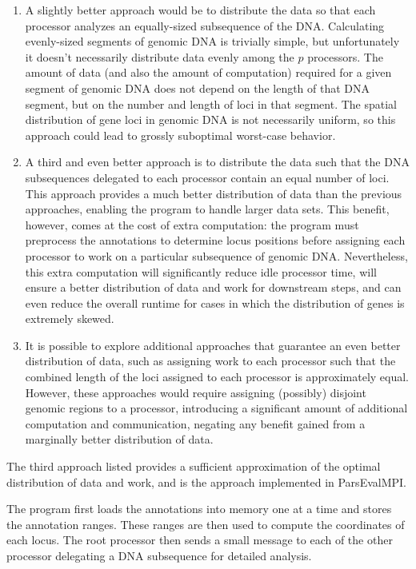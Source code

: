 \documentclass{bioinfo}
\begin{document}
\begin{methods}
\begin{enumerate}
  \item A slightly better approach would be to distribute the data so that each processor analyzes an equally-sized subsequence of the DNA. Calculating evenly-sized segments of genomic DNA is trivially simple, but unfortunately it doesn't necessarily distribute data evenly among the $p$ processors. The amount of data (and also the amount of computation) required for a given segment of genomic DNA does not depend on the length of that DNA segment, but on the number and length of loci in that segment. The spatial distribution of gene loci in genomic DNA is not necessarily uniform, so this approach could lead to grossly suboptimal worst-case behavior.

  \item A third and even better approach is to distribute the data such that the DNA subsequences delegated to each processor contain an equal number of loci. This approach provides a much better distribution of data than the previous approaches, enabling the program to handle larger data sets. This benefit, however, comes at the cost of extra computation: the program must preprocess the annotations to determine locus positions before assigning each processor to work on a particular subsequence of genomic DNA. Nevertheless, this extra computation will significantly reduce idle processor time, will ensure a better distribution of data and work for downstream steps, and can even reduce the overall runtime for cases in which the distribution of genes is extremely skewed.

  \item It is possible to explore additional approaches that guarantee an even better distribution of data, such as assigning work to each processor such that the combined length of the loci assigned to each processor is approximately equal. However, these approaches would require assigning (possibly) disjoint genomic regions to a processor, introducing a significant amount of additional computation and communication, negating any benefit gained from a marginally better distribution of data.
\end{enumerate}

The third approach listed provides a sufficient approximation of the optimal distribution of data and work, and is the approach implemented in ParsEvalMPI.

The program first loads the annotations into memory one at a time and stores the annotation ranges. These ranges are then used to compute the coordinates of each locus. The root processor then sends a small message to each of the other processor delegating a DNA subsequence for detailed analysis.


\end{methods}
\end{document}
